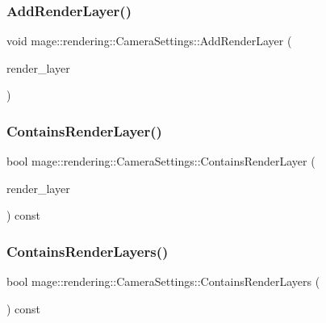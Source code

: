 \subsubsection{\texorpdfstring{Add\+Render\+Layer()}{AddRenderLayer()}}
{\footnotesize\ttfamily void mage\+::rendering\+::\+Camera\+Settings\+::\+Add\+Render\+Layer (\begin{DoxyParamCaption}\item[{\mbox{\hyperlink{namespacemage_1_1rendering_a466c2a441ea5b26e4625c2f34e021b3d}{Render\+Layer}}}]{render\+\_\+layer }\end{DoxyParamCaption})\hspace{0.3cm}{\ttfamily [noexcept]}}

\mbox{\label{classmage_1_1rendering_1_1_camera_settings_aab59f8b20a5d05fd23fff006ef741dac}} 
\subsubsection{\texorpdfstring{Contains\+Render\+Layer()}{ContainsRenderLayer()}}
{\footnotesize\ttfamily bool mage\+::rendering\+::\+Camera\+Settings\+::\+Contains\+Render\+Layer (\begin{DoxyParamCaption}\item[{\mbox{\hyperlink{namespacemage_1_1rendering_a466c2a441ea5b26e4625c2f34e021b3d}{Render\+Layer}}}]{render\+\_\+layer }\end{DoxyParamCaption}) const\hspace{0.3cm}{\ttfamily [noexcept]}}

\mbox{\label{classmage_1_1rendering_1_1_camera_settings_aa6a33e3b5936e440af32d2ca3d65585f}} 
\subsubsection{\texorpdfstring{Contains\+Render\+Layers()}{ContainsRenderLayers()}}
{\footnotesize\ttfamily bool mage\+::rendering\+::\+Camera\+Settings\+::\+Contains\+Render\+Layers (\begin{DoxyParamCaption}{ }\end{DoxyParamCaption}) const\hspace{0.3cm}{\ttfamily [noexcept]}}

